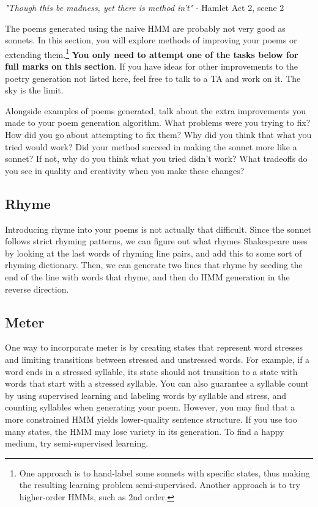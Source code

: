 \begin{center}
\emph{"Though this be madness, yet there is method in't"} - Hamlet Act 2, scene 2
\end{center}
\par
The poems generated using the naive HMM are probably not very good as sonnets. In this section, you will explore methods of improving your poems or extending them.\footnote{One approach is to hand-label some sonnets with specific states, thus making the resulting learning problem semi-supervised. Another approach is to try higher-order HMMs, such as 2nd order.} \textbf{You only need to attempt one of the tasks below for full marks on this section}. If you have ideas for other improvements to the poetry generation not listed here, feel free to talk to a TA and work on it. The sky is the limit.

Alongside examples of poems generated, talk about the extra improvements you made to your poem generation algorithm. What problems were you trying to fix? How did you go about attempting to fix them? Why did you think that what you tried would work? Did your method succeed in making the sonnet more like a sonnet? If not, why do you think what you tried didn't work? What tradeoffs do you see in quality and creativity when you make these changes? \newline

\subsection{Rhyme}
Introducing rhyme into your poems is not actually that difficult. Since the sonnet follows strict rhyming patterns, we can figure out what rhymes Shakespeare uses by looking at the last words of rhyming line pairs,  and add this to some sort of rhyming dictionary. Then, we can generate two lines that rhyme by seeding the end of the line with words that rhyme, and then do HMM generation in the reverse direction.

\subsection{Meter}
One way to incorporate meter is by creating states that represent word stresses and limiting transitions between stressed and unstressed words. For example, if a word ends in a stressed syllable, its state should not transition to a state with words that start with a stressed syllable. You can also guarantee a syllable count by using supervised learning and labeling words by syllable and stress, and counting syllables when generating your poem. However, you may find that a more constrained HMM yields lower-quality sentence structure. If you use too many states, the HMM may lose variety in its generation. To find a happy medium, try semi-supervised learning.


